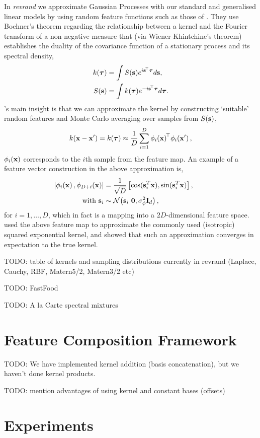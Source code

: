 \documentclass[11pt, oneside]{article}
\begin{document}
In \emph{revrand} we approximate Gaussian Processes with our standard and
generalised linear models by using random feature functions such as those of
\citeauthor{rahimi2007} \citeyearpar{rahimi2007,rahimi2008}. They use Bochner's
theorem regarding the relationship between a kernel and the Fourier transform
of a non-negative measure that (via Wiener-Khintchine's theorem) establishes
the duality of the covariance function of a stationary process and its spectral
density,
\begin{align}
	k(\boldsymbol{\tau}) &= \int S(\mathbf{s}) 
    e^{i \mathbf{s}^{\!\top}  \boldsymbol{\tau}} d \mathbf{s},  \\
	S(\mathbf{s}) &= \int k(\boldsymbol{\tau}) 
    e^{- i \mathbf{s}^{\!\top} \boldsymbol{\tau}}  d \boldsymbol{\tau}.
	\label{eq:fourier}
\end{align}
\citeauthor{rahimi2007}'s  main insight \citeyearpar{rahimi2007} is that we can
approximate the kernel by constructing `suitable' random features and Monte 
Carlo averaging over samples from $S(\mathbf{s})$,
\begin{equation}
    k(\mathbf{x} - \mathbf{x}') = k(\boldsymbol{\tau}) 
    \approx \frac{1}{D} \sum_{i=1}^{D} \phi_{i}\!\left({{\mathbf{x}}}\right)^{\!\top}\!
	\phi_{i}\!\left({{\mathbf{x}'}}\right),
	\label{eq:mcapprox}
\end{equation}
$\phi_{i}\!\left({{\mathbf{x}}}\right)$ corresponds to the $i$th sample from the feature
map. An example of a feature vector construction in the above approximation is,
\begin{align}
	\nonumber
    \left[{\phi_{i}\!\left({{\mathbf{x}}}\right), \phi_{D+i}\!\left({{\mathbf{x}}}\right)}\right]&= 
    \frac{1}{\sqrt{D}} \left[{\cos(\mathbf{s}_i^T \mathbf{x}), 
    \sin(\mathbf{s}_i^T \mathbf{x})}\right], \qquad \\
    \text{with}~\mathbf{s}_i & \sim 
    \mathcal{N}\!\left({\mathbf{s}_i}\middle\vert{\mathbf{0}, \sigma_{\ensuremath{\phi}}^2\ensuremath{\mathbf{I}_{d}}}\right),
\end{align}
for $i=1, \ldots, D$,  which in fact is a mapping into a $2 D$-dimensional
feature space.  \citet{rahimi2007} used the above feature map to approximate
the commonly used (isotropic) squared exponential kernel, and showed that such
an approximation converges in expectation to the true kernel.  

TODO: table of kernels and sampling distributions currently in revrand
(Laplace, Cauchy, RBF, Matern5/2, Matern3/2 etc)

TODO: FastFood

TODO: A la Carte spectral mixtures

\section{Feature Composition Framework}

TODO: We have implemented kernel addition (basis concatenation), but we haven't
done kernel products.

TODO: mention advantages of using kernel and constant bases (offsets)

\section{Experiments}



\end{document}
